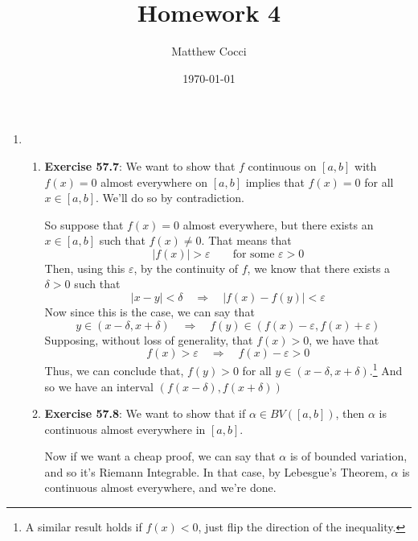 \documentclass[12pt]{article}
\author{Matthew Cocci}
\title{\textbf{Homework 4}}
\date{\today}
\theoremstyle{plain}
\theoremstyle{definition}
\theoremstyle{remark}
\begin{document}
\maketitle 

\begin{enumerate}

\item 
\begin{enumerate}
\item \textbf{Exercise 57.7}: We want to show that $f$ continuous on $[a,b]$ with $f(x)=0$ almost everywhere on $[a,b]$ implies that $f(x)=0$ for all $x\in[a,b]$. We'll do so by contradiction.

So suppose that $f(x)=0$ almost everywhere, but there exists an $x\in[a,b]$ such that $f(x)\neq 0$. That means that 
\[ 
    |f(x)| > \varepsilon \qquad \text{for some $\varepsilon>0$}
\]
Then, using this $\varepsilon$, by the continuity of $f$, we know that there exists a $\delta>0$ such that
\[
    |x-y|<\delta \quad \Rightarrow \quad |f(x)-f(y)|<\varepsilon
\]
Now since this is the case, we can say that
\[
    y\in(x-\delta, x+\delta) \quad \Rightarrow \quad 
    f(y) \in \left(f(x)-\varepsilon, f(x)+\varepsilon\right)
\]
Supposing, without loss of generality, that $f(x) > 0$, we have that 
\[
    f(x) > \varepsilon \quad \Rightarrow \quad
    f(x) - \varepsilon > 0
\]
Thus, we can conclude that, $f(y) > 0$ for all $y\in(x-\delta, x+\delta)$.\footnote{A similar result holds if $f(x)<0$, just flip the direction of the inequality.} And so we have an interval $(f(x-\delta), f(x+\delta))$ 

\item \textbf{Exercise 57.8}: We want to show that if $\alpha\in BV([a,b])$, then $\alpha$ is continuous almost everywhere in $[a,b]$.  

Now if we want a cheap proof, we can say that $\alpha$ is of bounded variation, and so it's Riemann Integrable. In that case, by Lebesgue's Theorem, $\alpha$ is continuous almost everywhere, and we're done.


\end{enumerate}
\end{enumerate}
\end{document}
